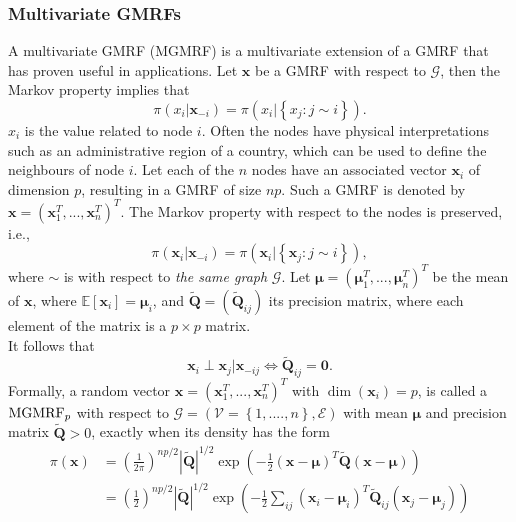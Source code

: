 \documentclass[12pt]{book}
\begin{document}
\subsubsection{Multivariate GMRFs}
A multivariate GMRF (MGMRF) is a multivariate extension of a GMRF that has proven useful in applications. Let $\pmb{x}$ be a GMRF with respect to $\mathcal{G}$, then the Markov property implies that
\begin{equation*}
    \pi\left(x_i|\pmb{x}_{-i}\right)=\pi\left(x_i|\left\lbrace x_j:j\sim i\right\rbrace\right).
\end{equation*}
$x_i$ is the value related to node $i$. Often the nodes have physical interpretations such as an administrative region of a country, which can be used to define the neighbours of node $i$. Let each of the $n$ nodes have an associated vector $\pmb{x}_i$ of dimension $p$, resulting in a GMRF of size $np$. Such a GMRF is denoted by $\pmb{x}=\left(\pmb{x}_1^T,...,\pmb{x}_n^T\right)^T$. The Markov property with respect to the nodes is preserved, i.e.,
\begin{equation*}
    \pi\left(\pmb{x}_i|\pmb{x}_{-i}\right)=\pi\left(\pmb{x}_i|\left\lbrace\pmb{x}_{j}:j\sim i\right\rbrace\right),
\end{equation*}
where $\sim$ is with respect to \textit{the same graph} $\mathcal{G}$. Let $\pmb{\mu}=\left(\pmb{\mu}_1^T,... ,\pmb{\mu}_n^T\right)^T$ be the mean of $\pmb{x}$, where $\mathbb{E}\left[\pmb{x}_i\right]=\pmb{\mu}_i$, and $\widetilde{\pmb{Q}}=\left(\widetilde{\pmb{Q}}_{ij}\right)$ its precision matrix, where each element of the matrix is a $p\times p$ matrix. \\
It follows that
\begin{equation*}
    \pmb{x}_i\perp\pmb{x}_j|\pmb{x}_{-ij}\Longleftrightarrow\widetilde{\pmb{Q}}_{ij}=\pmb{0}.
\end{equation*}
Formally, a random vector $\pmb{x}=\left(\pmb{x}_1^T,...,\pmb{x}_n^T\right)^T$ with $\dim\left(\pmb{x}_i\right)=p$, is called a $\hbox{MGMRF}_p$ with respect to $\mathcal{G}=\left(\mathcal{V}=\left\lbrace 1,. ...,n\right\rbrace,\mathcal{E}\right)$ with mean $\pmb{\mu}$ and precision matrix $\widetilde{\pmb{Q}} >0$, exactly when its density has the form
\begin{align*}
    \pi\left(\pmb{x}\right) &=\left(\frac{1}{2\pi}\right)^{np/2}\left|\widetilde{\pmb{Q}}\right|^{1/2}\exp\left(-\frac{1}{2}\left(\pmb{x}-\pmb{\mu}\right)^T\widetilde{\pmb{Q}}\left(\pmb{x}-\pmb{\mu}\right)\right)\\
    &=\left(\frac{1}{2}\right)^{np/2}\left|\widetilde{\pmb{Q}}\right|^{1/2}\exp\left(-\frac{1}{2}\sum_{ij}\left(\pmb{x}_i-\pmb{\mu}_i\right)^T\widetilde{\pmb{Q}}_{ij}\left(\pmb{x}_j-\pmb{\mu}_j\right)\right)
\end{align*}
\end{document}
